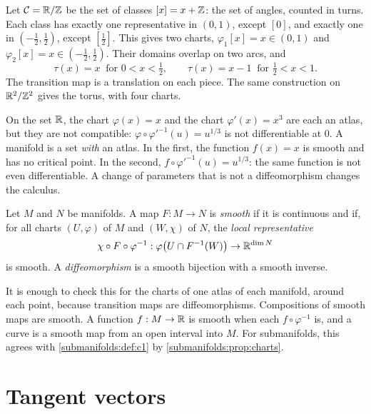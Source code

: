 \begin{notechapter}
\begin{example}\label{tangent-bundles:ex:circle}
Let $\mathcal C = \mathbb{R}/\mathbb{Z}$ be the set of classes $[x] = x + \mathbb{Z}$: the set of
angles, counted in turns. Each class has exactly one representative in
$(0, 1)$, except $[0]$, and exactly one in $(-\frac12, \frac12)$, except
$[\frac12]$. This gives two charts, $\varphi_1[x] = x\in(0, 1)$ and
$\varphi_2[x] = x\in(-\frac12, \frac12)$. Their domains overlap on two
arcs, and
\[
  \tau(x) = x \ \text{ for } 0 < x < \tfrac12 ,
  \qquad
  \tau(x) = x - 1 \ \text{ for } \tfrac12 < x < 1 .
\]
The transition map is a translation on each piece. The same construction
on $\mathbb{R}^2/\mathbb{Z}^2$ gives the torus, with four charts.
\end{example}

\begin{pitfall}
On the set $\mathbb{R}$, the chart $\varphi(x) = x$ and the chart
$\varphi'(x) = x^3$ are each an atlas, but they are not compatible:
$\varphi\circ\varphi'^{-1}(u) = u^{1/3}$ is not differentiable at $0$. A
manifold is a set \emph{with} an atlas. In the first, the function
$f(x) = x$ is smooth and has no critical point. In the second,
$f\circ\varphi'^{-1}(u) = u^{1/3}$: the same function is not even
differentiable. A change of parameters that is not a diffeomorphism
changes the calculus.
\end{pitfall}

\begin{definition}\label{tangent-bundles:def:smooth}
Let $M$ and $N$ be manifolds. A map $F:M\to N$ is \emph{smooth} if it is
continuous and if, for all charts $(U, \varphi)$ of $M$ and $(W, \chi)$
of $N$, the \emph{local representative}
\[
  \chi\circ F\circ\varphi^{-1} :
  \varphi\bigl(U\cap F^{-1}(W)\bigr)\to\mathbb{R}^{\dim N}
\]
is smooth. A \emph{diffeomorphism} is a smooth bijection with a smooth
inverse.
\end{definition}

It is enough to check this for the charts of one atlas of each manifold,
around each point, because transition maps are diffeomorphisms.
Compositions of smooth maps are smooth. A function $f:M\to\mathbb{R}$ is smooth
when each $f\circ\varphi^{-1}$ is, and a curve is a smooth map from an
open interval into $M$. For submanifolds, this agrees with
\cref{submanifolds:def:c1} by \cref{submanifolds:prop:charts}.

\section{Tangent vectors}\label{tangent-bundles:sec:tangent}


\end{notechapter}

